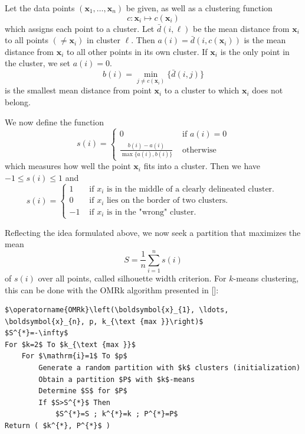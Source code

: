 \documentclass[10pt]{book}
\begin{document}
Let the data points $\left(\boldsymbol{x}_{1}, \ldots, \boldsymbol{x}_{n}\right)$ be given, as well as a clustering function
$$
c: \boldsymbol{x}_{i} \mapsto c\left(\boldsymbol{x}_{i}\right)
$$
which assigns each point to a cluster. Let $\bar{d}(i, \ell)$ be the mean distance from $\boldsymbol{x}_{i}$ to all points $\left(\neq \boldsymbol{x}_{i}\right)$ in cluster $\ell$. Then $a(i)=\bar{d}\left(i, c\left(\boldsymbol{x}_{i}\right)\right)$ is the mean distance from $\boldsymbol{x}_{i}$ to all other points in its own cluster. If $\boldsymbol{x}_{i}$ is the only point in the cluster, we set $a(i)=0$.
$$
b(i)=\min_{j \neq c\left(\boldsymbol{x}_{i}\right)}\{\bar{d}(i, j)\}
$$
is the smallest mean distance from point $\boldsymbol{x}_{i}$ to a cluster to which $\boldsymbol{x}_{i}$ does not belong.

We now define the function
$$
s(i)=\left\{\begin{array}{cc}
0 & \text { if } a(i)=0 \\
\frac{b(i)-a(i)}{\max \{a(i), b(i)\}} & \text { otherwise }
\end{array}\right.
$$
which measures how well the point $\boldsymbol{x}_{i}$ fits into a cluster. Then we have $-1 \leq s(i) \leq 1$ and
$$
s(i)= \begin{cases}
1 & \text { if } x_{i} \text { is in the middle of a clearly delineated cluster. } \\
0 & \text { if } x_{i} \text { lies on the border of two clusters. } \\
-1 & \text { if } x_{i} \text { is in the "wrong" cluster. }
\end{cases}
$$

Reflecting the idea formulated above, we now seek a partition that maximizes the mean
$$
S=\frac{1}{n} \sum_{i=1}^{n} s(i)
$$
of $s(i)$ over all points, called silhouette width criterion. For $k$-means clustering, this can be done with the OMRk algorithm presented in [\cite{barros2014oblique}]:

\begin{verbatim}
$\operatorname{OMRk}\left(\boldsymbol{x}_{1}, \ldots, \boldsymbol{x}_{n}, p, k_{\text {max }}\right)$
$S^{*}=-\infty$
For $k=2$ To $k_{\text {max }}$
    For $\mathrm{i}=1$ To $p$
        Generate a random partition with $k$ clusters (initialization)
        Obtain a partition $P$ with $k$-means
        Determine $S$ for $P$
        If $S>S^{*}$ Then
            $S^{*}=S ; k^{*}=k ; P^{*}=P$
Return ( $k^{*}, P^{*}$ )
\end{verbatim}
\end{document}
